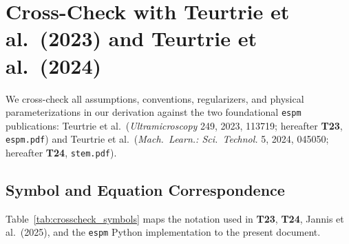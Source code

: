 \documentclass[11pt,a4paper]{article}
\theoremstyle{plain}
\theoremstyle{definition}
\theoremstyle{remark}
\begin{document}
\section{Cross-Check with Teurtrie et al.\ (2023) and Teurtrie et al.\ (2024)}

We cross-check all assumptions, conventions, regularizers, and physical parameterizations in our derivation against the two foundational \texttt{espm} publications: Teurtrie et al.\ (\emph{Ultramicroscopy} 249, 2023, 113719; hereafter \textbf{T23}, \texttt{espm.pdf}) and Teurtrie et al.\ (\emph{Mach.\ Learn.: Sci.\ Technol.} 5, 2024, 045050; hereafter \textbf{T24}, \texttt{stem.pdf}).

\subsection{Symbol and Equation Correspondence}
Table~\ref{tab:crosscheck_symbols} maps the notation used in \textbf{T23}, \textbf{T24}, Jannis et al.\ (2025), and the \texttt{espm} Python implementation to the present document.
\end{document}
